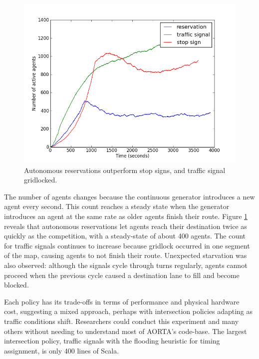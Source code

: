 \documentclass[letterpaper, 10 pt, conference]{ieeeconf}  %
\begin{document}
\begin{figure}[h]
  \centering \includegraphics[width=\linewidth]{agent_cnt_atx.png}
  \caption{Autonomous reservations outperform stop signs, and traffic signal
           gridlocked.}
  \label{fig:agent_cnt}
  \vspace{-10pt}
\end{figure}

The number of agents changes because the continuous generator introduces a new
agent every second. This count reaches a steady state when the generator
introduces an agent at the same rate as older agents finish their route. Figure
\ref{fig:agent_cnt} reveals that autonomous reservations let agents reach their
destination twice as quickly as the competition, with a steady-state of about
400 agents. The count for traffic signals continues to increase because gridlock
occurred in one segment of the map, causing agents to not finish their route.
Unexpected starvation was also observed: although the signals cycle through
turns regularly, agents cannot proceed when the previous cycle caused a
destination lane to fill and become blocked.

Each policy has its trade-offs in terms of performance and physical hardware
cost, suggesting a mixed approach, perhaps with intersection policies adapting
as traffic conditions shift. Researchers could conduct this experiment and many
others without needing to understand most of AORTA's code-base. The largest
intersection policy, traffic signals with the flooding heuristic for timing
assignment, is only 400 lines of Scala.

\end{document}

